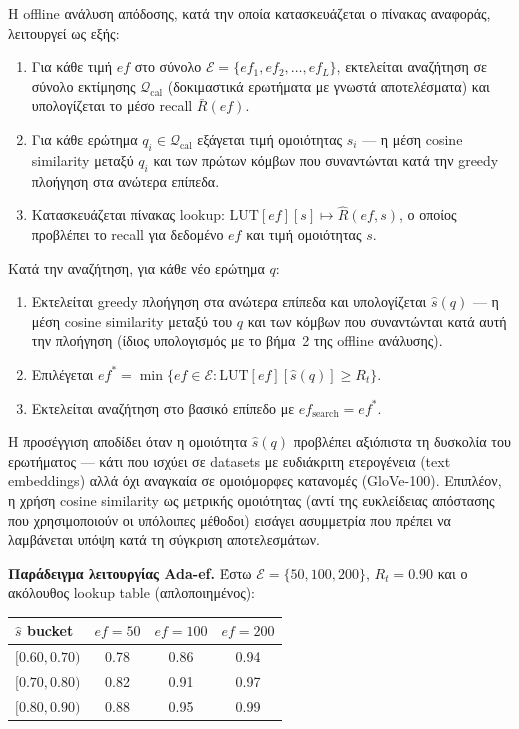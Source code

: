\documentclass[12pt,a4paper]{article}
\begin{document}
Η offline ανάλυση απόδοσης, κατά την οποία κατασκευάζεται ο πίνακας αναφοράς, λειτουργεί ως εξής:
\begin{enumerate}
    \item Για κάθε τιμή $ef$ στο σύνολο $\mathcal{E} = \{ef_1, ef_2, \ldots, ef_L\}$, εκτελείται αναζήτηση σε σύνολο εκτίμησης $\mathcal{Q}_{\text{cal}}$ (δοκιμαστικά ερωτήματα με γνωστά αποτελέσματα) και υπολογίζεται το μέσο recall $\bar{R}(ef)$.
    \item Για κάθε ερώτημα $q_i \in \mathcal{Q}_{\text{cal}}$ εξάγεται τιμή ομοιότητας $s_i$ — η μέση cosine similarity μεταξύ $q_i$ και των πρώτων κόμβων που συναντώνται κατά την greedy πλοήγηση στα ανώτερα επίπεδα.
    \item Κατασκευάζεται πίνακας lookup: $\text{LUT}[ef][s] \mapsto \hat{R}(ef, s)$, ο οποίος προβλέπει το recall για δεδομένο $ef$ και τιμή ομοιότητας $s$.
\end{enumerate}
Κατά την αναζήτηση, για κάθε νέο ερώτημα $q$:
\begin{enumerate}
    \item Εκτελείται greedy πλοήγηση στα ανώτερα επίπεδα και υπολογίζεται $\hat{s}(q)$ --- η μέση cosine similarity μεταξύ του $q$ και των κόμβων που συναντώνται κατά αυτή την πλοήγηση (ίδιος υπολογισμός με το βήμα~2 της offline ανάλυσης).
    \item Επιλέγεται $ef^* = \min\{ef \in \mathcal{E} : \text{LUT}[ef][\hat{s}(q)] \geq R_t\}$.
    \item Εκτελείται αναζήτηση στο βασικό επίπεδο με $ef_{\text{search}} = ef^*$.
\end{enumerate}
Η προσέγγιση αποδίδει όταν η ομοιότητα $\hat{s}(q)$ προβλέπει αξιόπιστα τη δυσκολία του ερωτήματος — κάτι που ισχύει σε datasets με ευδιάκριτη ετερογένεια (text embeddings) αλλά όχι αναγκαία σε ομοιόμορφες κατανομές (GloVe-100). Επιπλέον, η χρήση cosine similarity ως μετρικής ομοιότητας (αντί της ευκλείδειας απόστασης που χρησιμοποιούν οι υπόλοιπες μέθοδοι) εισάγει ασυμμετρία που πρέπει να λαμβάνεται υπόψη κατά τη σύγκριση αποτελεσμάτων.

\textbf{Παράδειγμα λειτουργίας Ada-ef.}
Έστω $\mathcal{E} = \{50, 100, 200\}$, $R_t = 0.90$ και ο ακόλουθος lookup table (απλοποιημένος):

\begin{center}
\begin{tabular}{lccc}
\toprule
$\hat{s}$ bucket & $ef=50$ & $ef=100$ & $ef=200$ \\
\midrule
$[0.60, 0.70)$ & 0.78 & 0.86 & 0.94 \\
$[0.70, 0.80)$ & 0.82 & 0.91 & 0.97 \\
$[0.80, 0.90)$ & 0.88 & 0.95 & 0.99 \\
\bottomrule
\end{tabular}
\end{center}
\end{document}
